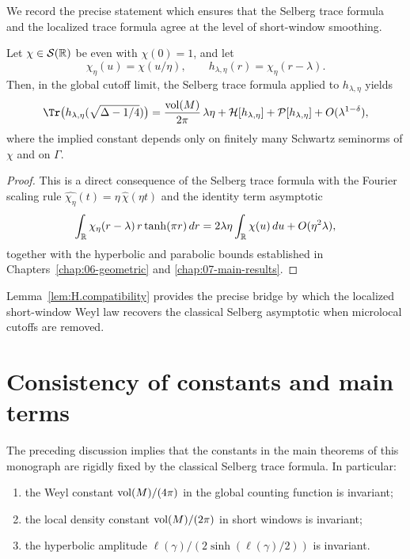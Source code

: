 We record the precise statement which ensures that the Selberg trace formula and the localized trace formula agree at
the level of short-window smoothing.

\begin{lemma}
\label{lem:H.compatibility}
Let $\chi\in\mathcal{S}(\mathbb{R})$ be even with $\chi(0)=1$, and let
\[
\chi_\eta(u)=\chi(u/\eta),
\qquad
h_{\lambda,\eta}(r)=\chi_\eta(r-\lambda).
\]
Then, in the global cutoff limit, the Selberg trace formula applied to $h_{\lambda,\eta}$ yields
\begin{equation}\label{eq:H.compatibility.eq}
\Tr\big(h_{\lambda,\eta}(\sqrt{\Delta-1/4})\big)
=
\frac{\vol(M)}{2\pi}\,\lambda\eta
+
\mathcal{H}[h_{\lambda,\eta}]
+
\mathcal{P}[h_{\lambda,\eta}]
+
O(\lambda^{1-\delta}),
\end{equation}
where the implied constant depends only on finitely many Schwartz seminorms of $\chi$ and on $\Gamma$.
\end{lemma}

\begin{proof}
This is a direct consequence of the Selberg trace formula with the Fourier scaling rule
$\widehat{\chi_\eta}(t)=\eta\,\widehat{\chi}(\eta t)$ and the identity term asymptotic
\[
\int_{\mathbb{R}}\chi_\eta(r-\lambda)\,r\tanh(\pi r)\,dr
=
2\lambda\eta\int_{\mathbb{R}}\chi(u)\,du
+
O(\eta^2\lambda),
\]
together with the hyperbolic and parabolic bounds established in Chapters~\ref{chap:06-geometric} and
\ref{chap:07-main-results}.
\end{proof}

Lemma~\ref{lem:H.compatibility} provides the precise bridge by which the localized short-window Weyl law recovers the
classical Selberg asymptotic when microlocal cutoffs are removed.

\section{Consistency of constants and main terms}
\label{sec:H.constants}

The preceding discussion implies that the constants in the main theorems of this monograph are rigidly fixed by the
classical Selberg trace formula.
In particular:
\begin{enumerate}
\item the Weyl constant $\mathop{\mathrm{vol}}\nolimits(M)/(4\pi)$ in the global counting function is invariant;
\item the local density constant $\mathop{\mathrm{vol}}\nolimits(M)/(2\pi)$ in short windows is invariant;
\item the hyperbolic amplitude $\ell(\gamma)/(2\sinh(\ell(\gamma)/2))$ is invariant.
\end{enumerate}

